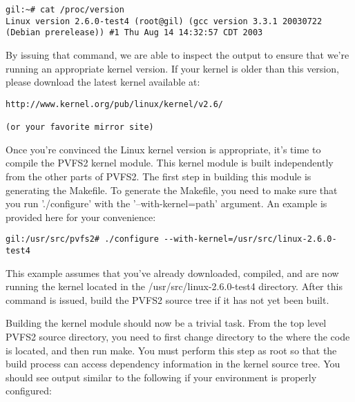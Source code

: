 \documentclass[11pt, letterpaper]{article}
\begin{document}
\begin{verbatim}
gil:~# cat /proc/version 
Linux version 2.6.0-test4 (root@gil) (gcc version 3.3.1 20030722
(Debian prerelease)) #1 Thu Aug 14 14:32:57 CDT 2003
\end{verbatim}

By issuing that command, we are able to inspect the output to ensure
that we're running an appropriate kernel version.  If your kernel is
older than this version, please download the latest kernel available
at:

\begin{verbatim}
http://www.kernel.org/pub/linux/kernel/v2.6/

(or your favorite mirror site)
\end{verbatim}

Once you're convinced the Linux kernel version is appropriate, it's
time to compile the PVFS2 kernel module.  This kernel module is built
independently from the other parts of PVFS2.  The first step in
building this module is generating the Makefile.  To generate the
Makefile, you need to make sure that you run './configure' with the
'--with-kernel=path' argument.  An example is provided here for your
convenience:

\begin{verbatim}
gil:/usr/src/pvfs2# ./configure --with-kernel=/usr/src/linux-2.6.0-test4
\end{verbatim}

This example assumes that you've already downloaded, compiled, and are
now running the kernel located in the /usr/src/linux-2.6.0-test4
directory.  After this command is issued, build the PVFS2 source tree
if it has not yet been built.

Building the kernel module should now be a trivial task.  From the top
level PVFS2 source directory, you need to first change directory to
the where the code is located, and then run make.  You must perform
this step as root so that the build process can access dependency
information in the kernel source tree.  You should see
output similar to the following if your environment is properly
configured:
\end{document}
